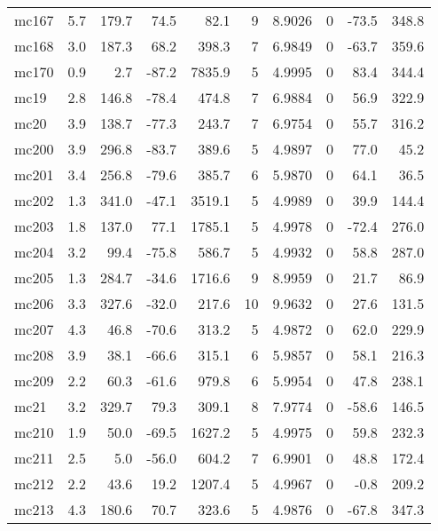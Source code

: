 \documentclass{article}
\begin{document}
\begin{longtable}{lrrrrrrrrr}
 mc167 &  5.7 &  179.7 &  74.5 &    82.1 &   9 &   8.9026 &       0 &    -73.5 &     348.8 \\
 mc168 &  3.0 &  187.3 &  68.2 &   398.3 &   7 &   6.9849 &       0 &    -63.7 &     359.6 \\
 mc170 &  0.9 &    2.7 & -87.2 &  7835.9 &   5 &   4.9995 &       0 &     83.4 &     344.4 \\
  mc19 &  2.8 &  146.8 & -78.4 &   474.8 &   7 &   6.9884 &       0 &     56.9 &     322.9 \\
  mc20 &  3.9 &  138.7 & -77.3 &   243.7 &   7 &   6.9754 &       0 &     55.7 &     316.2 \\
 mc200 &  3.9 &  296.8 & -83.7 &   389.6 &   5 &   4.9897 &       0 &     77.0 &      45.2 \\
 mc201 &  3.4 &  256.8 & -79.6 &   385.7 &   6 &   5.9870 &       0 &     64.1 &      36.5 \\
 mc202 &  1.3 &  341.0 & -47.1 &  3519.1 &   5 &   4.9989 &       0 &     39.9 &     144.4 \\
 mc203 &  1.8 &  137.0 &  77.1 &  1785.1 &   5 &   4.9978 &       0 &    -72.4 &     276.0 \\
 mc204 &  3.2 &   99.4 & -75.8 &   586.7 &   5 &   4.9932 &       0 &     58.8 &     287.0 \\
 mc205 &  1.3 &  284.7 & -34.6 &  1716.6 &   9 &   8.9959 &       0 &     21.7 &      86.9 \\
 mc206 &  3.3 &  327.6 & -32.0 &   217.6 &  10 &   9.9632 &       0 &     27.6 &     131.5 \\
 mc207 &  4.3 &   46.8 & -70.6 &   313.2 &   5 &   4.9872 &       0 &     62.0 &     229.9 \\
 mc208 &  3.9 &   38.1 & -66.6 &   315.1 &   6 &   5.9857 &       0 &     58.1 &     216.3 \\
 mc209 &  2.2 &   60.3 & -61.6 &   979.8 &   6 &   5.9954 &       0 &     47.8 &     238.1 \\
  mc21 &  3.2 &  329.7 &  79.3 &   309.1 &   8 &   7.9774 &       0 &    -58.6 &     146.5 \\
 mc210 &  1.9 &   50.0 & -69.5 &  1627.2 &   5 &   4.9975 &       0 &     59.8 &     232.3 \\
 mc211 &  2.5 &    5.0 & -56.0 &   604.2 &   7 &   6.9901 &       0 &     48.8 &     172.4 \\
 mc212 &  2.2 &   43.6 &  19.2 &  1207.4 &   5 &   4.9967 &       0 &     -0.8 &     209.2 \\
 mc213 &  4.3 &  180.6 &  70.7 &   323.6 &   5 &   4.9876 &       0 &    -67.8 &     347.3 \\

\end{longtable}
\end{document}
